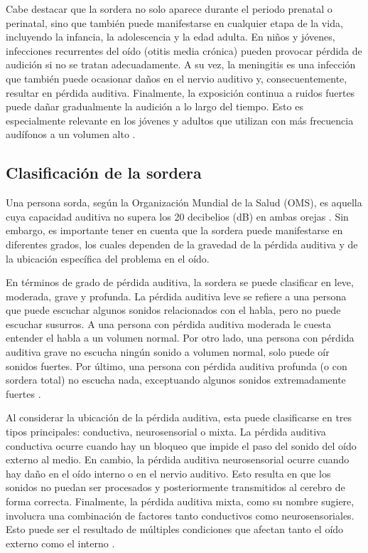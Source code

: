 Cabe destacar que la sordera no solo aparece durante el periodo prenatal o perinatal, sino que también puede manifestarse en cualquier etapa de la vida, incluyendo la infancia, la adolescencia y la edad adulta. En niños y jóvenes, infecciones recurrentes del oído (otitis media crónica) pueden provocar pérdida de audición si no se tratan adecuadamente. A su vez, la meningitis es una infección que también puede ocasionar daños en el nervio auditivo y, consecuentemente, resultar en pérdida auditiva. Finalmente, la exposición continua a ruidos fuertes puede dañar gradualmente la audición a lo largo del tiempo. Esto es especialmente relevante en los jóvenes y adultos que utilizan con más frecuencia audífonos a un volumen alto \cite{six}.


\subsection{Clasificación de la sordera}

Una persona sorda, según la Organización Mundial de la Salud (OMS), es aquella cuya capacidad auditiva no supera los 20 decibelios (dB) en ambas orejas \cite{six}. Sin embargo, es importante tener en cuenta que la sordera puede manifestarse en diferentes grados, los cuales dependen de la gravedad de la pérdida auditiva y de la ubicación específica del problema en el oído.

En términos de grado de pérdida auditiva, la sordera se puede clasificar en leve, moderada, grave y profunda. La pérdida auditiva leve se refiere a una persona que puede escuchar algunos sonidos relacionados con el habla, pero no puede escuchar susurros. A una persona con pérdida auditiva moderada le cuesta entender el habla a un volumen normal. Por otro lado, una persona con pérdida auditiva grave no escucha ningún sonido a volumen normal, solo puede oír sonidos fuertes. Por último, una persona con pérdida auditiva profunda (o con sordera total) no escucha nada, exceptuando algunos sonidos extremadamente fuertes \cite{eight}. 

Al considerar la ubicación de la pérdida auditiva, esta puede clasificarse en tres tipos principales: conductiva, neurosensorial o mixta. La pérdida auditiva conductiva ocurre cuando hay un bloqueo que impide el paso del sonido del oído externo al medio. En cambio, la pérdida auditiva neurosensorial ocurre cuando hay daño en el oído interno o en el nervio auditivo. Esto resulta en que los sonidos no puedan ser procesados y posteriormente transmitidos al cerebro de forma correcta. Finalmente, la pérdida auditiva mixta, como su nombre sugiere, involucra una combinación de factores tanto conductivos como neurosensoriales. Esto puede ser el resultado de múltiples condiciones que afectan tanto el oído externo como el interno \cite{eight}. 


